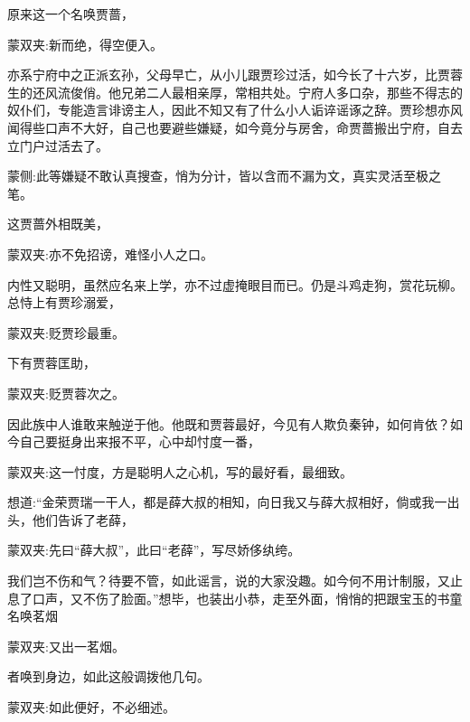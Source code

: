 \begin{parag}
    原来这一个名唤贾蔷，\begin{note}蒙双夹:新而绝，得空便入。\end{note}亦系宁府中之正派玄孙，父母早亡，从小儿跟贾珍过活，如今长了十六岁，比贾蓉生的还风流俊俏。他兄弟二人最相亲厚，常相共处。宁府人多口杂，那些不得志的奴仆们，专能造言诽谤主人，因此不知又有了什么小人诟谇谣诼之辞。贾珍想亦风闻得些口声不大好，自己也要避些嫌疑，如今竟分与房舍，命贾蔷搬出宁府，自去立门户过活去了。\begin{note}蒙侧:此等嫌疑不敢认真搜查，悄为分计，皆以含而不漏为文，真实灵活至极之笔。\end{note}这贾蔷外相既美，\begin{note}蒙双夹:亦不免招谤，难怪小人之口。\end{note}内性又聪明，虽然应名来上学，亦不过虚掩眼目而已。仍是斗鸡走狗，赏花玩柳。总恃上有贾珍溺爱，\begin{note}蒙双夹:贬贾珍最重。\end{note}下有贾蓉匡助，\begin{note}蒙双夹:贬贾蓉次之。\end{note}因此族中人谁敢来触逆于他。他既和贾蓉最好，今见有人欺负秦钟，如何肯依？如今自己要挺身出来报不平，心中却忖度一番，\begin{note}蒙双夹:这一忖度，方是聪明人之心机，写的最好看，最细致。\end{note}想道:“金荣贾瑞一干人，都是薛大叔的相知，向日我又与薛大叔相好，倘或我一出头，他们告诉了老薛，\begin{note}蒙双夹:先曰“薛大叔”，此曰“老薛”，写尽娇侈纨绔。\end{note}我们岂不伤和气？待要不管，如此谣言，说的大家没趣。如今何不用计制服，又止息了口声，又不伤了脸面。”想毕，也装出小恭，走至外面，悄悄的把跟宝玉的书童名唤茗烟\begin{note}蒙双夹:又出一茗烟。\end{note}者唤到身边，如此这般调拨他几句。\begin{note}蒙双夹:如此便好，不必细述。\end{note}
\end{parag}


